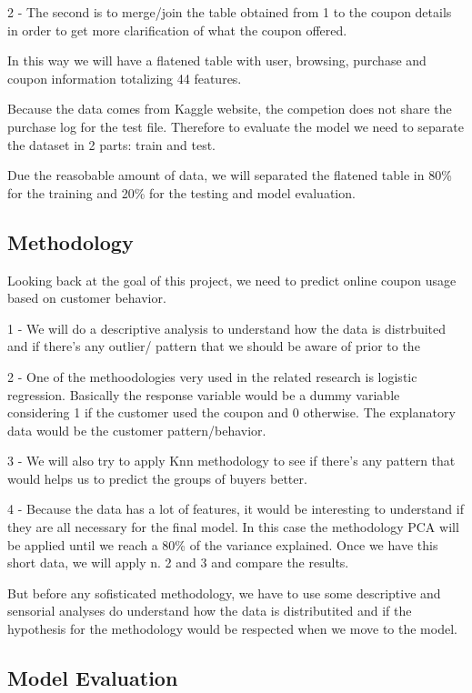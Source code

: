 \documentclass[]{article}
\begin{document}
2 - The second is to merge/join the table obtained from 1 to the coupon
details in order to get more clarification of what the coupon offered.

In this way we will have a flatened table with user, browsing, purchase
and coupon information totalizing 44 features.

Because the data comes from Kaggle website, the competion does not share
the purchase log for the test file. Therefore to evaluate the model we
need to separate the dataset in 2 parts: train and test.

Due the reasobable amount of data, we will separated the flatened table
in 80\% for the training and 20\% for the testing and model evaluation.

\subsection{Methodology}\label{methodology}

Looking back at the goal of this project, we need to predict online
coupon usage based on customer behavior.

1 - We will do a descriptive analysis to understand how the data is
distrbuited and if there's any outlier/ pattern that we should be aware
of prior to the

2 - One of the methoodologies very used in the related research is
logistic regression. Basically the response variable would be a dummy
variable considering 1 if the customer used the coupon and 0 otherwise.
The explanatory data would be the customer pattern/behavior.

3 - We will also try to apply Knn methodology to see if there's any
pattern that would helps us to predict the groups of buyers better.

4 - Because the data has a lot of features, it would be interesting to
understand if they are all necessary for the final model. In this case
the methodology PCA will be applied until we reach a 80\% of the
variance explained. Once we have this short data, we will apply n. 2 and
3 and compare the results.

But before any sofisticated methodology, we have to use some descriptive
and sensorial analyses do understand how the data is distributited and
if the hypothesis for the methodology would be respected when we move to
the model.

\subsection{Model Evaluation}\label{model-evaluation}
\end{document}
